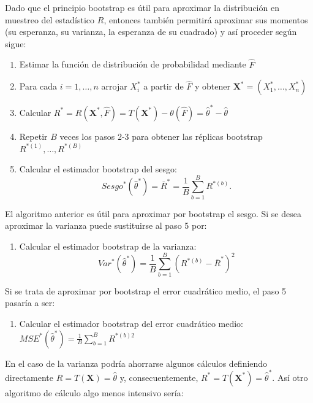 \documentclass[]{book}
\providecommand{\tightlist}{%
  \setlength{\itemsep}{0pt}\setlength{\parskip}{0pt}}
\theoremstyle{definition}
\theoremstyle{definition}
\theoremstyle{definition}
\theoremstyle{remark}
\begin{document}
Dado que el principio bootstrap es útil para aproximar la distribución
en muestreo del estadístico \(R\), entonces también permitirá aproximar
sus momentos (su esperanza, su varianza, la esperanza de su cuadrado) y
así proceder según sigue:

\begin{enumerate}
\def\labelenumi{\arabic{enumi}.}
\item
  Estimar la función de distribución de probabilidad mediante
  \(\hat{F}\)
\item
  Para cada \(i=1,\ldots ,n\) arrojar \(X_i^{\ast}\) a partir de
  \(\hat{F}\) y obtener
  \(\mathbf{X}^{\ast}=\left( X_1^{\ast}, \ldots ,X_n^{\ast} \right)\)
\item
  Calcular
  \(R^{\ast}=R\left( \mathbf{X}^{\ast},\hat{F} \right) =T\left( \mathbf{X}^{\ast} \right) -\theta \left( \hat{F} \right) = \hat{\theta}^{\ast}- \hat \theta\)
\item
  Repetir \(B\) veces los pasos 2-3 para obtener las réplicas bootstrap
  \(R^{\ast (1)}, \ldots, R^{\ast (B)}\)
\item
  Calcular el estimador bootstrap del sesgo:
  \[Sesgo^{\ast}\left( \hat{\theta}^{\ast} \right) =\bar{R}^{\ast}=\frac{1
  }{B}\sum_{b=1}^{B}R^{\ast (b)}.\]
\end{enumerate}

El algoritmo anterior es útil para aproximar por bootstrap el sesgo. Si
se desea aproximar la varianza puede sustituirse al paso 5 por:

\begin{enumerate}
\def\labelenumi{\arabic{enumi}.}
\setcounter{enumi}{4}
\tightlist
\item
  Calcular el estimador bootstrap de la varianza:
  \[Var^{\ast}\left( \hat{\theta}^{\ast} \right) =\frac{1}{B}
  \sum_{b=1}^{B}\left( R^{\ast (b)}-\bar{R}^{\ast} \right)^2\]
\end{enumerate}

Si se trata de aproximar por bootstrap el error cuadrático medio, el
paso 5 pasaría a ser:

\begin{enumerate}
\def\labelenumi{\arabic{enumi}.}
\setcounter{enumi}{4}
\tightlist
\item
  Calcular el estimador bootstrap del error cuadrático medio:
  \(MSE^{\ast}\left( \hat{\theta}^{\ast} \right) =\frac{1}{B}\sum_{b=1}^{B}R^{\ast (b) 2}\)
\end{enumerate}

En el caso de la varianza podría ahorrarse algunos cálculos definiendo
directamente \(R=T\left( \mathbf{X} \right) =\hat{\theta}\) y,
consecuentemente,
\(R^{\ast}=T\left( \mathbf{X}^{\ast} \right) = \hat{\theta}^{\ast}\).
Así otro algoritmo de cálculo algo menos intensivo sería:
\end{document}
